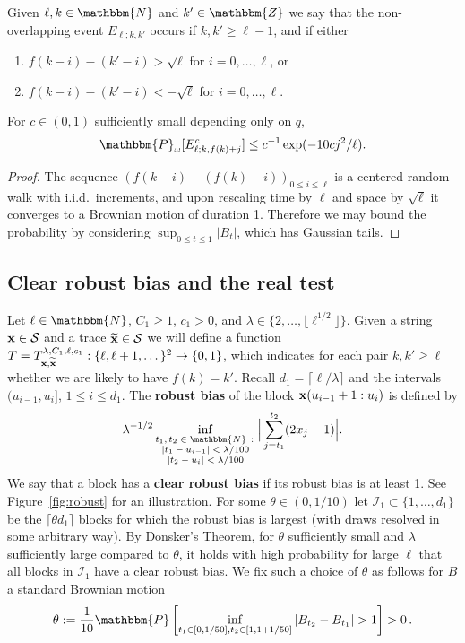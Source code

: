 \documentclass[final,12pt]{colt2018} %
\newcommand{\N}{\mathbbm{N}}
\newcommand{\Z}{\mathbbm{Z}}
\renewcommand{\P}{\mathbbm{P}}
\newcommand{\1}{\mathbf{1}}
\def\cS{\mathcal{S}}
\def\cI{\mathcal{I}}
\def\cS{\mathcal{S}}
\newcommand{\eqb}{\begin{equation}}
\newcommand{\eqe}{\end{equation}}
\newcommand{\wt}{\widetilde}
\def\xt{{\wt {\bf x}}}
\def\x{{\bf x}}
\begin{document}
\begin{definition} \label{def4}
	Given $\ell, k\in \N$ and $k'\in\Z$ we say that the non-overlapping event
	$E_{\ell ; k , k'}$ occurs if $k , k'\geq\ell-1$, and if either
	\begin{enumerate}[$(i)$]
		\item $f(k-i)-(k'-i)>\sqrt{\ell}$ for $i=0,\dots,\ell$, or
		\item $f(k-i)-(k'-i)<-\sqrt{\ell}$ for $i=0,\dots,\ell$.
	\end{enumerate}
\end{definition}

\begin{lemma}\label{prop11}
	For $c \in (0,1)$ sufficiently small depending only on $q$,
	\eqb \label{eq:overlap}
	\P_\omega [E_{\ell ; k , f(k)+j}^c] \leq c^{-1} \exp(- 10 c j^2 / \ell).
	\eqe
\end{lemma}
%
\begin{proof}
	The sequence $(f(k-i) - (f(k) - i))_{0 \leq i \leq \ell}$ is a centered random walk with i.i.d.\ increments, and upon rescaling time by $\ell$ and space by $\sqrt{\ell}$ it converges to a Brownian motion of duration 1.
	Therefore we may bound the probability by
	considering $\sup_{0 \leq t \leq 1} |B_t|$, which has Gaussian tails.
\end{proof}

\subsection{Clear robust bias and the real test} \label{ss:robust}

Let $\ell \in \N$, $C_1 \geq 1$, $c_1>0$, and $\lambda \in \{ 2, \dots , \lfloor
\ell^{1/2} \rfloor \}$.
Given  a string $\x \in \cS$ and a trace $\xt \in \cS$ we will define
a function $T = T^{\lambda , C_1 , \ell,c_1}_{\x , \xt} : \{ \ell ,
\ell + 1 , \dots \}^2 \to \{0,1\}$, which indicates for each pair
$k , k' \geq \ell$ whether we are likely to have $f(k) = k'$.
%
Recall $d_1 = \lceil \ell / \lambda \rceil$ and the intervals
$(u_{i-1} , u_i]$, $1 \leq i \leq d_1$.
The {\bf robust bias} of the block $\x(u_{i-1}+1 : u_i)$ is defined by
\eqb
\lambda^{-1/2}\inf_{\substack
	{
		\text{$t_1,t_2\in\N\,:\,$} \\
		\text{$|t_1-u_{i-1}|<\lambda/100$} \\
		\text{$|t_2-u_{i}|<\lambda/100$} \\
}}
\Big|\sum_{j=t_1}^{t_2} (2x_j-1)\Big|.
\label{eq25}
\eqe
%
We say that a block has a {\bf clear robust bias} if its robust bias
is at least 1.  See Figure~\ref{fig:robust} for an illustration.
%
For some $\theta\in(0 , 1/10)$ let $\cI_1 \subset \{1 , \dots , d_1 \}$
be the $\lceil \theta d_1\rceil$ blocks for which the robust bias is
largest (with draws resolved in some arbitrary way).  By Donsker's Theorem,
for $\theta$ sufficiently small and $\lambda$ sufficiently large compared
to $\theta$, it holds with high probability for large $\ell$ that all blocks in $\cI_1$
have a clear robust bias.  We fix such a choice of $\theta$ as follows
for $B$ a standard Brownian motion
\eqb
\theta := \frac{1}{10} \P \left [ \inf_{t_1 \in [0 , 1/50] , t_2
	\in[1 , 1 + 1/50]} |B_{t_2} - B_{t_1}| > 1 \right ] > 0 \, .
\label{eq18}
\eqe
\end{document}
